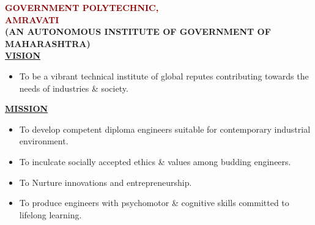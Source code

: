 \thispagestyle{empty}

\vspace*{-5mm}
\begin{center}
  {\fontsize{18}{22}\selectfont \bfseries \textcolor{darkred}{GOVERNMENT POLYTECHNIC,}\\[2mm]
  \textcolor{darkred}{AMRAVATI}}\\[3mm]
  {\fontsize{10}{13}\selectfont \bfseries (AN AUTONOMOUS INSTITUTE OF GOVERNMENT OF MAHARASHTRA)}\\[8mm]
  
  {\fontsize{13}{16}\selectfont \bfseries \underline{VISION}}\\[3mm]
\end{center}
\begin{itemize}[leftmargin=12mm, label=\textbullet]
  \item To be a vibrant technical institute of global reputes contributing towards the needs of industries \& society.
\end{itemize}

\begin{center}
  \vspace{4mm}
  {\fontsize{13}{16}\selectfont \bfseries \underline{MISSION}}\\[3mm]
\end{center}
\begin{itemize}[leftmargin=12mm, label=\textbullet]
  \item To develop competent diploma engineers suitable for contemporary industrial environment.
  \item To inculcate socially accepted ethics \& values among budding engineers.
  \item To Nurture innovations and entrepreneurship.
  \item To produce engineers with psychomotor \& cognitive skills committed to lifelong learning.
\end{itemize}

